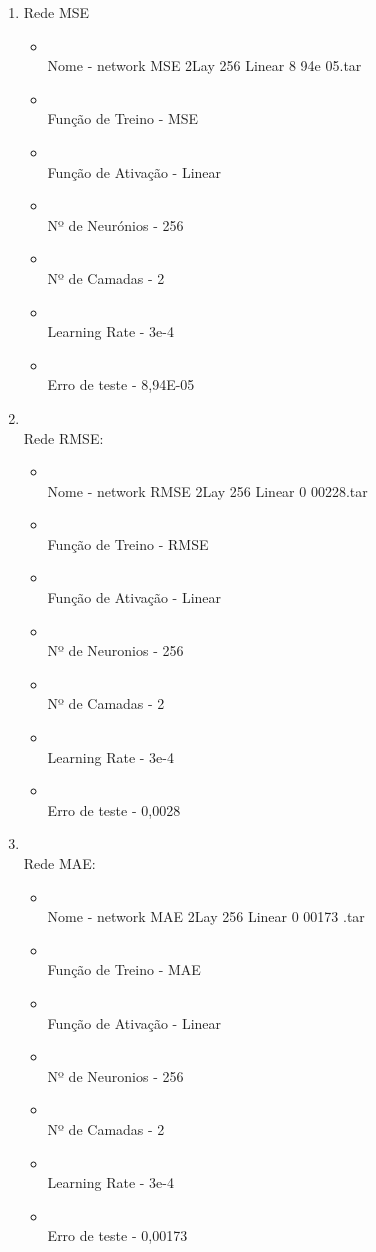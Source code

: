 \documentclass[10pt]{article}
\begin{document}
\begin{enumerate}
\item Rede MSE
  \begin{itemize}
    \item\\Nome - network MSE 2Lay 256 Linear 8 94e 05.tar
    \item\\Função de Treino - MSE
    \item\\Função de Ativação - Linear
    \item\\Nº de Neurónios - 256
    \item\\Nº de Camadas - 2
    \item\\Learning Rate - 3e-4
    \item\\Erro de teste - 8,94E-05
  \end{itemize}
  \vspace{2cm}
  \item \\Rede RMSE:
  \begin{itemize}
    \item\\Nome - network RMSE 2Lay 256 Linear 0 00228.tar
    \item\\Função de Treino - RMSE
    \item\\Função de Ativação - Linear
    \item\\Nº de Neuronios - 256
    \item\\Nº de Camadas - 2
    \item\\Learning Rate - 3e-4
    \item\\Erro de teste - 0,0028
  \end{itemize}  
  \vspace{2cm}
  \item\\Rede MAE:
  \begin{itemize} 
    \item\\Nome - network MAE 2Lay 256 Linear 0 00173 .tar
    \item\\Função de Treino - MAE
    \item\\Função de Ativação - Linear
    \item\\Nº de Neuronios - 256
    \item\\Nº de Camadas - 2
    \item\\Learning Rate - 3e-4
    \item\\Erro de teste - 0,00173
  \end{itemize}
\end{enumerate}
  \newpage
\end{document}
